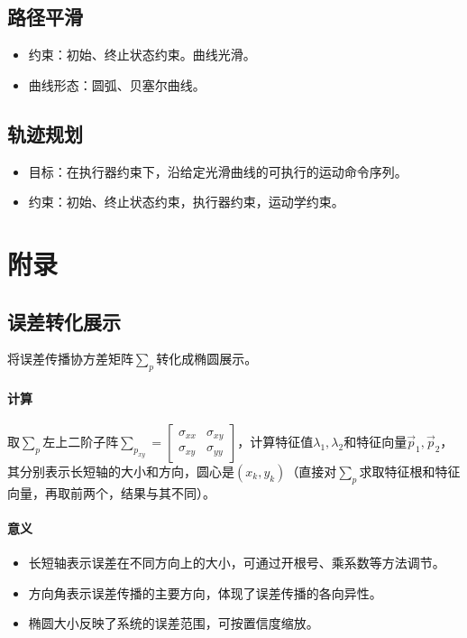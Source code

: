 \documentclass[
12pt, %
a4paper, 
oneside, %
headinclude,footinclude, %
]{scrartcl}
\begin{document}
\subsection[路径平滑]{路径平滑}
\begin{itemize}
\item 约束：初始、终止状态约束。曲线光滑。
\item 曲线形态：圆弧、贝塞尔曲线。
\end{itemize}
\subsection[轨迹规划]{轨迹规划}
\begin{itemize}
\item 目标：在执行器约束下，沿给定光滑曲线的可执行的运动命令序列。
\item 约束：初始、终止状态约束，执行器约束，运动学约束。
\end{itemize}
\section{附录}
\subsection[误差转化展示]{误差转化展示}\label{sec:error}
将误差传播协方差矩阵$ \sum_p $转化成椭圆展示。
\paragraph{计算}
取$ \sum_p $左上二阶子阵$ \sum_{p_{xy}} = \begin{bmatrix} \sigma_{xx} & \sigma_{xy} \\ \sigma_{xy} & \sigma_{yy} \end{bmatrix} $，计算特征值$ \lambda_1,\lambda_2 $和特征向量$ \overrightarrow{p}_1,\overrightarrow{p}_2 $，其分别表示长短轴的大小和方向，圆心是$ (x_k, y_k) $（直接对$ \sum_p $求取特征根和特征向量，再取前两个，结果与其不同）。
\paragraph{意义}
\begin{itemize}
\item 长短轴表示误差在不同方向上的大小，可通过开根号、乘系数等方法调节。
\item 方向角表示误差传播的主要方向，体现了误差传播的各向异性。
\item 椭圆大小反映了系统的误差范围，可按置信度缩放。
\end{itemize}
\end{document}
